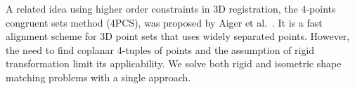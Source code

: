 A related idea using higher order constraints in 3D registration, the 4-points congruent sets method (4PCS), was proposed by Aiger et al.~\cite{Aiger08}.
It is a fast alignment scheme for 3D point sets that uses widely separated points.
However, the need to find coplanar 4-tuples of points and the assumption of rigid transformation limit its applicability.
We solve both rigid and isometric shape matching problems with a single approach.
